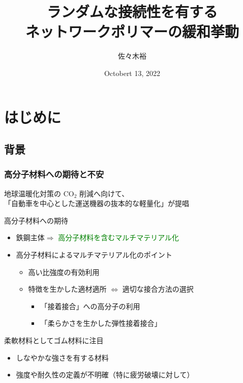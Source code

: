 \documentclass[12pt, dvipdfmx]{beamer}
\title
[ランダムな接続性を有するネットワークポリマーの緩和挙動]
{ランダムな接続性を有する\\ネットワークポリマーの緩和挙動}
\author[東亞合成　佐々木]{佐々木裕}
\institute[東亞合成]{東亞合成}
\date{Octobert 13, 2022}
\begin{document}
\setlength{\abovedisplayskip}{2pt} %
\setlength{\belowdisplayskip}{2pt} %

\begin{frame}[noframenumbering]\frametitle{}
	\titlepage
\end{frame}

\section{はじめに}

\subsection{背景}

\begin{frame}
	\frametitle{高分子材料への期待と不安}
	地球温暖化対策の CO$_2$ 削減へ向けて、\\
	「自動車を中心とした運送機器の{\color{red}抜本的な軽量化}」が提唱
	\begin{block}{高分子材料への期待}
		\begin{itemize}
			\item 鉄鋼主体$ \Rightarrow$ \textcolor{green}{高分子材料を含むマルチマテリアル化}
			\item 高分子材料によるマルチマテリアル化のポイント
				\begin{itemize}
					\item \alert{高い比強度}の有効利用
					\item 特徴を生かした適材適所 $\Leftrightarrow$ 適切な接合方法の選択
						\begin{itemize}
							\item {\color{red} 「接着接合」}への高分子の利用
							\item {\color{red} 「柔らかさを生かした弾性接着接合」}
						\end{itemize}
				\end{itemize}
		\end{itemize}
	\end{block}
	\begin{alertblock}{柔軟材料としてゴム材料に注目}
		\begin{itemize}
			\item しなやかな強さを有する材料
			\item {\color{blue}強度や耐久性の定義が不明確（特に疲労破壊に対して）}
		\end{itemize}
	\end{alertblock}
\end{frame}
\end{document}
